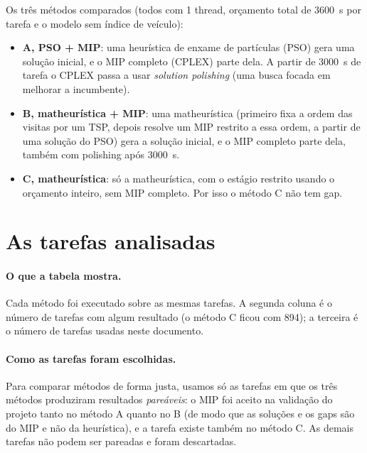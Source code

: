\documentclass[11pt,a4paper]{article}
\begin{document}
Os três métodos comparados (todos com 1 thread, orçamento total de 3600~s por
tarefa e o modelo sem índice de veículo):

\begin{itemize}[leftmargin=*]
  \item \textbf{A, PSO + MIP}: uma heurística de enxame de partículas (PSO) gera
  uma solução inicial, e o MIP completo (CPLEX) parte dela. A partir de 3000~s
  de tarefa o CPLEX passa a usar \emph{solution polishing} (uma busca focada em
  melhorar a incumbente).
  \item \textbf{B, matheurística + MIP}: uma matheurística (primeiro fixa a ordem
  das visitas por um TSP, depois resolve um MIP restrito a essa ordem, a partir
  de uma solução do PSO) gera a solução inicial, e o MIP completo parte dela,
  também com polishing após 3000~s.
  \item \textbf{C, matheurística}: só a matheurística, com o estágio restrito
  usando o orçamento inteiro, sem MIP completo. Por isso o método C não tem gap.
\end{itemize}

\section{As tarefas analisadas}

\begin{table}[H]
  \centering
  \small
  
  \caption{Tarefas com resultado e tarefas analisadas em cada método.}
  \label{tab:execucao}
\end{table}

\paragraph{O que a tabela mostra.} Cada método foi executado sobre as mesmas
\nTasks{} tarefas. A segunda coluna é o número de tarefas com algum resultado
(o método C ficou com 894); a terceira é o número de tarefas usadas neste
documento.

\paragraph{Como as tarefas foram escolhidas.} Para comparar métodos de forma
justa, usamos só as \nPaired{} tarefas em que os três métodos produziram
resultados \emph{pareáveis}: o MIP foi aceito na validação do projeto tanto no
método A quanto no B (de modo que as soluções e os gaps são do MIP e não da
heurística), e a tarefa existe também no método C. As demais \nExcluded{} tarefas
não podem ser pareadas e foram descartadas.
\end{document}
